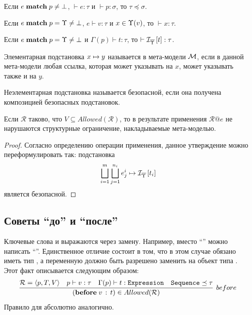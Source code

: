 \begin{Lemm}
Если $e \; \mathbf{match} \; p \neq \bot$, $\vdash e : \tau$ и $\vdash p : \sigma$, то $\tau \preceq \sigma$.
\end{Lemm}

\begin{Lemm}
Если $e \; \mathbf{match} \; p = \Upsilon \neq \bot$, $e \vdash v : \tau$ и $x \in \Upsilon(v)$, то $\vdash x : \tau$.
\end{Lemm}

\begin{Lemm}
Если $e \; \mathbf{match} \; p = \Upsilon \neq \bot$ и $\Gamma(p) \vdash t : \tau$, то $\vdash \mathcal{I}_{\overline{\Upsilon}} \left[ t \right] : \tau$.
\end{Lemm}

\begin{Def}
Элементарная подстановка $x \mapsto y$ называется  в мета-модели $\mathcal{M}$, если в данной мета-модели любая ссылка, которая может указывать на $x$, может указывать также и на $y$.

Неэлементарная подстановка называется безопасной, если она получена композицией безопасных подстановок.
\end{Def}

\begin{Th}
Если $\mathcal{R}$ таково, что $V \subseteq Allowed(\mathcal{R})$, то в результате применения $\mathcal{R}@e$ не нарушаются структурные ограничение, накладываемые мета-моделью.
\end{Th}
\begin{proof}
Согласно определению операции применения, данное утверждение можно переформулировать так: подстановка
$$
\bigsqcup\limits_{i=1}^{m} \bigsqcup\limits_{j=1}^{n_i}
			e^i_j \mapsto \mathcal{I}_{\overline{\Upsilon}} \left[ t_i \right]
$$
является безопасной.
\end{proof}

\subsection{Советы ``до'' и ``после''}

Ключевые слова  и  выражаются через замену. Например, вместо ``'' можно написать ``''. Единственное отличие состоит в том, что  в этом случае обязано иметь тип , а переменную  должно быть разрешено заменить на объект типа . Этот факт описывается следующим образом:
$$
	\infer[before]{
		(\mathbf{before} \; v \, : \, t) \in Allowed(\mathcal{R})
	}{
		\mathcal{R} = \langle p, T, V \rangle &
		p \vdash v : \tau &
		\Gamma(p) \vdash t : \mathtt{Expression} &
		\mathtt{Sequence} \preceq \tau
	}
$$
Правило для  абсолютно аналогично.

